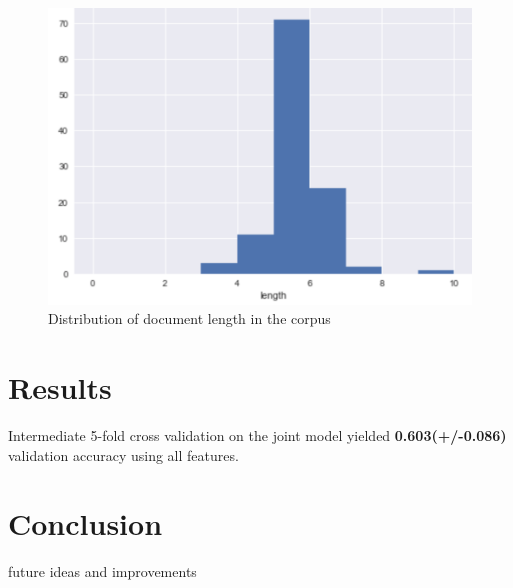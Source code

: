 \documentclass[onecolumn]{article}
\begin{document}
\begin{figure}[h]
    \centering
    \includegraphics[width=0.4\linewidth]{fig/doc-length.png}
    \caption{Distribution of document length in the corpus}\label{fig:length}
\end{figure}




\section{Results}
Intermediate 5-fold cross validation on the joint model yielded \textbf{0.603(+/-0.086)} validation accuracy using all features.

\section{Conclusion}
future ideas and improvements

\nocite{*}


\end{document}

